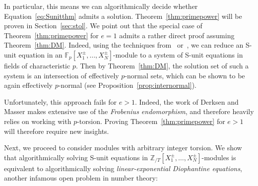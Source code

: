 \documentclass[letterpaper, 11pt, thm-restate]{article}
\numberwithin{equation}{section}
\newcommand{\F}{\mathbb{F}}
\newcommand{\ZT}{\mathbb{Z}_{/T}}
\theoremstyle{definition}
\theoremstyle{definition}
\theoremstyle{definition}
\begin{document}
In particular, this means we can algorithmically decide whether Equation~\eqref{eq:Sunitthm} admits a solution.
Theorem~\ref{thm:primepower} will be proven in Section~\ref{sec:stol}.
We point out that the special case of Theorem~\ref{thm:primepower} for $e = 1$ admits a rather direct proof assuming Theorem~\ref{thm:DM}.
Indeed, using the techniques from~\cite[Section~9]{derksen2007skolem} or~\cite[Section~5]{dong2024submonoid}, we can reduce an S-unit equation in an $\F_p[X_1^{\pm}, \ldots, X_N^{\pm}]$-module to a system of S-unit equations in fields of characteristic $p$.
Then by Theorem~\ref{thm:DM}, the solution set of such a system is an intersection of effectively $p$-normal sets, which can be shown to be again effectively $p$-normal (see Proposition~\ref{prop:internormal}).

Unfortunately, this approach fails for $e > 1$.
Indeed, the work of Derksen and Masser makes extensive use of the \emph{Frobenius endomorphism}, and therefore heavily relies on working with $p$-torsion.
Proving Theorem~\ref{thm:primepower} for $e > 1$ will therefore require new insights.

Next, we proceed to consider modules with arbitrary integer torsion.
We show that algorithmically solving S-unit equations in $\ZT[X_1^{\pm}, \ldots, X_N^{\pm}]$-modules is equivalent to algorithmically solving \emph{linear-exponential Diophantine equations}, another infamous open problem in number theory:
\end{document}
